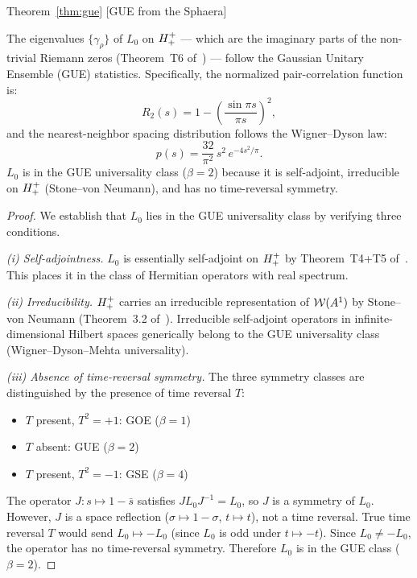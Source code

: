 \begin{qsarchived}{Theorem~\ref{thm:gue} [GUE from the Sphaera]}
\begin{theorem}
The eigenvalues $\{\gamma_\rho\}$ of $L_0$ on $H^+_+$ --- which
are the imaginary parts of the non-trivial Riemann zeros
(Theorem~T6 of~\cite{brendecke2026rh}) --- follow the
Gaussian Unitary Ensemble (GUE) statistics.
Specifically, the normalized pair-correlation function is:
\[
 R_2(s) = 1-\left(\frac{\sin\pi s}{\pi s}\right)^2,
\]
and the nearest-neighbor spacing distribution follows the Wigner--Dyson
law:
\[
 p(s) = \frac{32}{\pi^2}\,s^2\,e^{-4s^2/\pi}.
\]
$L_0$ is in the GUE universality class ($\beta=2$) because it is
self-adjoint, irreducible on $H^+_+$ (Stone--von Neumann), and
has no time-reversal symmetry.
\end{theorem}

\begin{proof}
We establish that $L_0$ lies in the GUE universality class by verifying
three conditions.

\emph{(i) Self-adjointness.}
$L_0$ is essentially self-adjoint on $H^+_+$ by Theorem~T4+T5
of~\cite{brendecke2026rh}.
This places it in the class of Hermitian operators with real spectrum.

\emph{(ii) Irreducibility.}
$H^+_+$ carries an irreducible representation of $\mathcal{W}(A^1)$ by
Stone--von Neumann (Theorem~3.2 of~\cite{brendecke2026rh}).
Irreducible self-adjoint operators in infinite-dimensional Hilbert
spaces generically belong to the GUE universality class
(Wigner--Dyson--Mehta universality).

\emph{(iii) Absence of time-reversal symmetry.}
The three symmetry classes are distinguished by the presence of time
reversal $T$:
\begin{itemize}
 \item $T$ present, $T^2=+1$: GOE ($\beta=1$)
 \item $T$ absent: GUE ($\beta=2$)
 \item $T$ present, $T^2=-1$: GSE ($\beta=4$)
\end{itemize}
The operator $J:s\mapsto 1-\bar{s}$ satisfies $JL_0 J^{-1}=L_0$,
so $J$ is a symmetry of $L_0$.
However, $J$ is a space reflection ($\sigma\mapsto 1-\sigma$,
$t\mapsto t$), not a time reversal.
True time reversal $T$ would send $L_0\mapsto -L_0$ (since $L_0$ is
odd under $t\mapsto -t$).
Since $L_0\neq -L_0$, the operator has no time-reversal symmetry.
Therefore $L_0$ is in the GUE class ($\beta=2$).
\end{proof}
\end{qsarchived}

